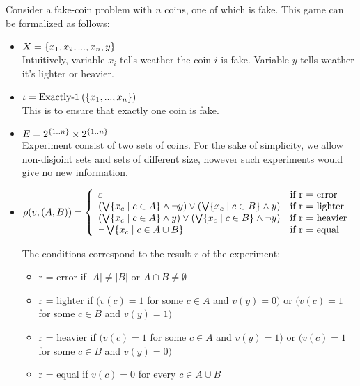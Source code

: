 \begin{example}
Consider a fake-coin problem with $n$ coins, one of which is fake. This game can be formalized as follows:
\begin{itemize}
\item 
$X = \{x_1, x_2, ..., x_n, y\}$ \\
Intuitively, variable $x_i$ tells weather the coin $i$ is fake. Variable $y$ tells weather it's lighter or heavier.

\item 
$\iota = \textrm{Exactly-1}\:(\{x_1, ..., x_n\})$ \\
This is to ensure that exactly one coin is fake.

\item 
$E = 2^{\{1..n\}} \times 2^{\{1..n\}}$ \\
Experiment consist of two sets of coins. 
For the sake of simplicity, we allow non-disjoint sets and sets of different size, 
however such experiments would give no new information.

\item $\rho(v, (A,B)) = \left\{
\begin{array}{ll}
\varepsilon & \textrm{if r = error} \\
(\bigvee\{x_c \;|\; c \in A\} \wedge \neg y) \vee (\bigvee\{x_c \;|\; c \in B\} \wedge y) & 
	\textrm{if r = lighter} \\
(\bigvee\{x_c \;|\; c \in A\} \wedge y) \vee (\bigvee\{x_c \;|\; c \in B\} \wedge \neg y) & 
	\textrm{if r = heavier} \\
\neg \bigvee\{x_c \;|\; c\in A\cup B\} &
	\textrm{if r = equal}
\end{array} \right.$

The conditions correspond to the result $r$ of the experiment:
\begin{itemize}
\item r = error if $|A|\not=|B|$ or $A\cap B\not=\emptyset$
\item r = lighter if $(v(c) = 1$ for some $c\in A$ and $v(y) = 0)$ or $(v(c) = 1$ for some $c \in B$ and $v(y) = 1)$ 
\item r = heavier if $(v(c) = 1$ for some $c\in A$ and $v(y) = 1)$ or $(v(c) = 1$ for some $c \in B$ and $v(y) = 0)$
\item r = equal if $v(c) = 0$ for every $c\in A\cup B$
\end{itemize}
\end{itemize}



\end{example}

